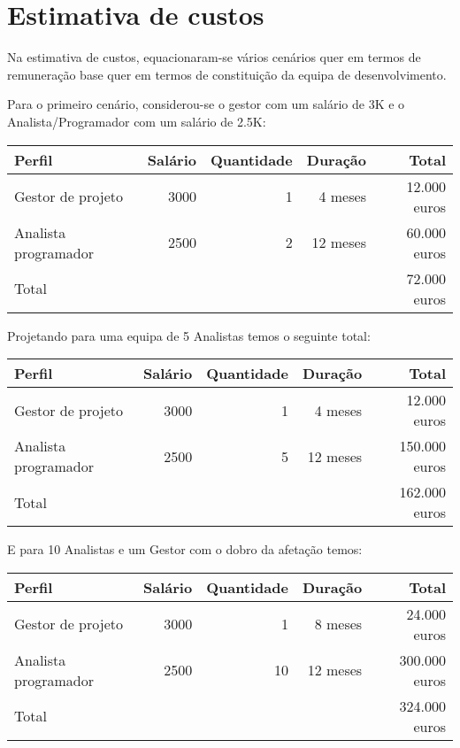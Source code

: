 \section{Estimativa de custos}

Na estimativa de custos, equacionaram-se vários cenários quer em termos de remuneração base quer em termos de constituição da equipa de desenvolvimento.

Para o primeiro cenário, considerou-se o gestor com um salário de 3K e o Analista/Programador com um salário de 2.5K:

\begin{table}[h!]
    \centering
    \begin{tabular}{|l|r|r|r|r|}
        \hline
        \textbf{Perfil} & \textbf{Salário} & \textbf{Quantidade} & \textbf{Duração} & \textbf{Total} \\
        \hline
        Gestor de projeto & 3000 & 1 & 4 meses & 12.000 euros\\
        \hline
        Analista programador & 2500 & 2 & 12 meses & 60.000 euros\\
        \hline
        Total & & & & 72.000 euros \\
        \hline
    \end{tabular}
\end{table}

Projetando para uma equipa de 5 Analistas temos o seguinte total:

\begin{table}[h!]
    \centering
    \begin{tabular}{|l|r|r|r|r|}
        \hline
        \textbf{Perfil} & \textbf{Salário} & \textbf{Quantidade} & \textbf{Duração} & \textbf{Total} \\
        \hline
        Gestor de projeto & 3000 & 1 & 4 meses & 12.000 euros\\
        \hline
        Analista programador & 2500 & 5 & 12 meses & 150.000 euros\\
        \hline
        Total & & & & 162.000 euros \\
        \hline
    \end{tabular}
\end{table}

E para 10 Analistas e um Gestor com o dobro da afetação temos: 

\begin{table}[h!]
    \centering
    \begin{tabular}{|l|r|r|r|r|}
        \hline
        \textbf{Perfil} & \textbf{Salário} & \textbf{Quantidade} & \textbf{Duração} & \textbf{Total} \\
        \hline
        Gestor de projeto & 3000 & 1 & 8 meses & 24.000 euros\\
        \hline
        Analista programador & 2500 & 10 & 12 meses & 300.000 euros\\
        \hline
        Total & & & & 324.000 euros \\
        \hline
    \end{tabular}
\end{table}

